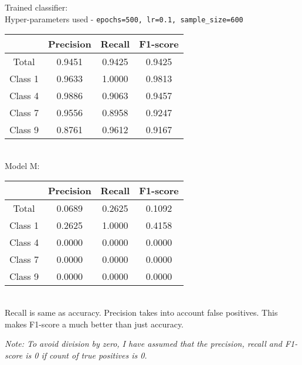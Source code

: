 \documentclass[12pt, fleqn]{article}
\begin{document}
Trained classifier: \\
Hyper-parameters used - \texttt{epochs=500, lr=0.1, sample\_size=600} \\
\begin{tabular}{|c||c|c|c||}
  \hline
          & Precision & Recall & F1-score \\
  \hline
  Total   & 0.9451    & 0.9425 & 0.9425   \\
  Class 1 & 0.9633    & 1.0000 & 0.9813   \\
  Class 4 & 0.9886    & 0.9063 & 0.9457   \\
  Class 7 & 0.9556    & 0.8958 & 0.9247   \\
  Class 9 & 0.8761    & 0.9612 & 0.9167   \\
  \hline
\end{tabular} \\

Model M: \\
\begin{tabular}{|c||c|c|c||}
  \hline
          & Precision & Recall & F1-score \\
  \hline
  Total   & 0.0689    & 0.2625 & 0.1092   \\
  Class 1 & 0.2625    & 1.0000 & 0.4158   \\
  Class 4 & 0.0000    & 0.0000 & 0.0000   \\
  Class 7 & 0.0000    & 0.0000 & 0.0000   \\
  Class 9 & 0.0000    & 0.0000 & 0.0000   \\
  \hline
\end{tabular} \\

Recall is same as accuracy. Precision takes into account false positives. This makes F1-score a much better than just accuracy.

\medskip

\textit{Note: To avoid division by zero, I have assumed that the precision, recall and F1-score is 0 if count of true positives is 0.}
\end{document}
